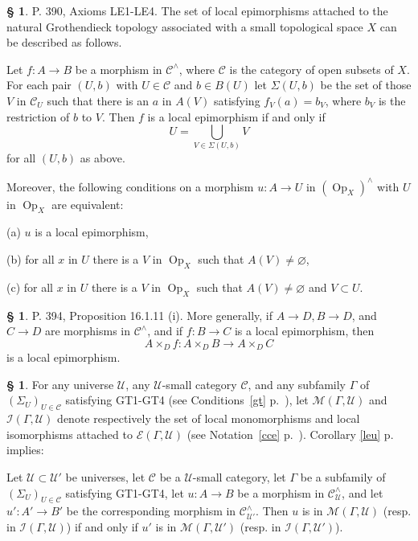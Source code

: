\documentclass[12pt]{article}%
\theoremstyle{remark}
\theoremstyle{definition}
\newtheorem{s}[thm]{\S}%
\newcommand{\nn}{\noindent}
\newcommand{\cc}{\mathcal}
\newcommand{\oo}{\operatorname}
\newcommand{\C}{\mathcal C}
\newcommand{\U}{\mathcal U}
\begin{document}
\begin{s}\label{390}
P. 390, Axioms LE1-LE4. The set of local epimorphisms attached to the natural Grothendieck topology associated with a small topological space $X$ can be described as follows. 

Let $f:A\to B$ be a morphism in $\C^\wedge$, where $\C$ is the category of open subsets of $X$. For each pair $(U,b)$ with $U\in\C$ and $b\in B(U)$ let $\Sigma(U,b)$ be the set of those $V$ in $\C_U$ such that there is an $a$ in $A(V)$ satisfying $f_V(a)=b_V$, where $b_V$ is the restriction of $b$ to $V$. Then $f$ is a local epimorphism if and only if 
$$
U=\bigcup_{V\in\Sigma(U,b)}V
$$ 
for all $(U,b)$ as above.

Moreover, the following conditions on a morphism $u:A\to U$ in $(\oo{Op}_X)^\wedge$ with $U$ in $\oo{Op}_X$ are equivalent:

\nn(a) $u$ is a local epimorphism,

\nn(b) for all $x$ in $U$ there is a $V$ in $\oo{Op}_X$ such that $A(V)\ne\varnothing$,

\nn(c) for all $x$ in $U$ there is a $V$ in $\oo{Op}_X$ such that $A(V)\ne\varnothing$ and $V\subset U$.
\end{s}

%

\begin{s}\label{16111}
P. 394, Proposition 16.1.11 (i). More generally, if $A\to D, B\to D$, and $C\to D$ are morphisms in $\C^\wedge$, and if $f:B\to C$ is a local epimorphism, then 
$$
A\times_Df:A\times_DB\to A\times_DC
$$ 
is a local epimorphism.
\end{s}

%

\begin{s}
For any universe $\U$, any $\U$-small category $\C$, and any subfamily $\Gamma$ of $(\Sigma_U)_{U\in\C}$ satisfying GT1-GT4 (see Conditions~\ref{gt} p.~\pageref{gt}), let $\cc M(\Gamma,\U)$ and $\cc I(\Gamma,\U)$ denote respectively the set of local monomorphisms and local isomorphisms attached to $\cc E(\Gamma,\U)$ (see Notation~\ref{cce} p.~\pageref{cce}). Corollary \ref{leu} p. \pageref{leu} implies:

Let $\U\subset\U'$ be universes, let $\C$ be a $\U$-small category, let $\Gamma$ be a subfamily of $(\Sigma_U)_{U\in\C}$ satisfying GT1-GT4, let $u:A\to B$ be a morphism in $\C^\wedge_\U$, and let $u':A'\to B'$ be the corresponding morphism in $\C^\wedge_{\U'}$. Then $u$ is in $\cc M(\Gamma,\U)$ (resp. in $\cc I(\Gamma,\U)$) if and only if $u'$ is in $\cc M(\Gamma,\U')$ (resp. in $\cc I(\Gamma,\U')$).
\end{s}
\end{document}
